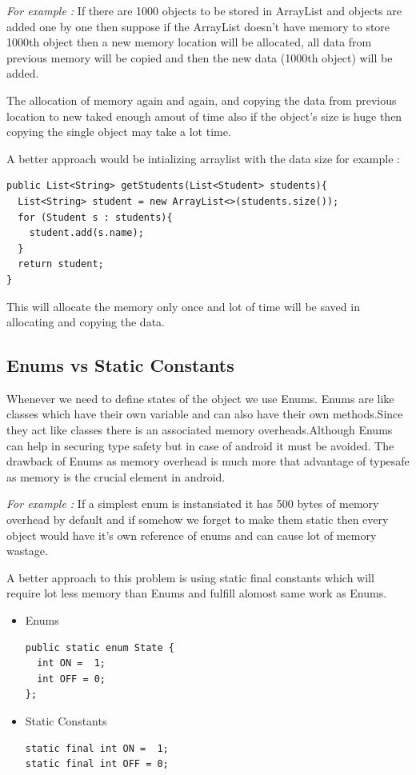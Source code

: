 \documentclass[journal]{IEEEtran}
\begin{document}
\emph{For example :} If there are 1000 objects to be stored in ArrayList and objects are added one by one then suppose if the ArrayList doesn't have memory to store 1000th object then a new memory location will be allocated, all data from previous memory will be copied and then the new data (1000th object) will be added.

The allocation of memory again and again, and copying the data from previous location to new taked enough amout of time also if the object's size is huge then copying the single object may take a lot time.

A better approach would be intializing arraylist with the data size for example :

\begin{verbatim}
public List<String> getStudents(List<Student> students){
  List<String> student = new ArrayList<>(students.size());
  for (Student s : students){
    student.add(s.name);
  }
  return student;
}
\end{verbatim}
This will allocate the memory only once and lot of time will be saved in allocating and copying
the data.


\subsection{Enums vs Static Constants}
Whenever we need to define states of the object we use Enums. Enums are like classes which have their own variable and can also have their own methods.Since they act like classes there is an associated memory overheads.Although Enums can help in securing type safety but in case of android it must be avoided. The drawback of Enums as memory overhead is much more that advantage of typesafe as memory is the crucial element in android.

\emph{For example :} If a simplest enum is instansiated it has 500 bytes of memory overhead by default and if somehow we forget to make them static then every object would have it's own reference of enums and can cause lot of memory wastage.

A better approach to this problem is using static final constants which will require lot less memory than Enums and fulfill alomost same work as Enums.

\begin{itemize}
	\item Enums
\begin{verbatim}
public static enum State {
  int ON =  1;
  int OFF = 0;
};
\end{verbatim}
	\item Static Constants
\begin{verbatim}
static final int ON =  1;
static final int OFF = 0;
\end{verbatim}
\end{itemize}
\end{document}
